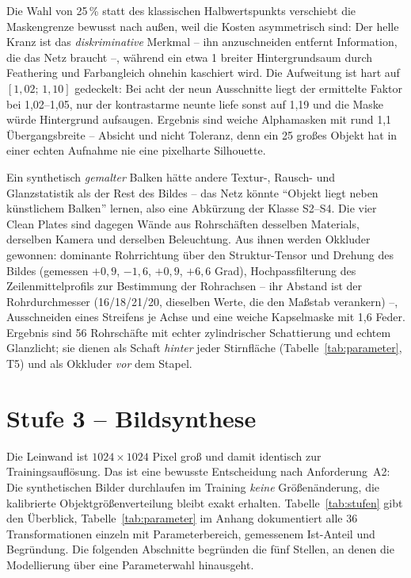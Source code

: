 Die Wahl von 25\,\% statt des klassischen Halbwertspunkts
\parencite{gonzalez2018} verschiebt die Maskengrenze bewusst nach außen, weil die
Kosten asymmetrisch sind: Der helle Kranz ist das \emph{diskriminative} Merkmal
-- ihn anzuschneiden entfernt Information, die das Netz braucht --, während ein
etwa 1\px{} breiter Hintergrundsaum durch Feathering und Farbangleich ohnehin
kaschiert wird. Die Aufweitung ist hart auf $[1{,}02;\,1{,}10]$ gedeckelt: Bei
acht der neun Ausschnitte liegt der ermittelte Faktor bei 1,02--1,05, nur der
kontrastarme neunte liefe sonst auf 1,19 und die Maske würde Hintergrund
aufsaugen. Ergebnis sind weiche Alphamasken mit rund 1,1\px{} Übergangsbreite --
Absicht und nicht Toleranz, denn ein 25\px{} großes Objekt hat in einer echten
Aufnahme nie eine pixelharte Silhouette.

 Ein synthetisch \emph{gemalter} Balken hätte andere
Textur-, Rausch- und Glanzstatistik als der Rest des Bildes -- das Netz könnte
\enquote{Objekt liegt neben künstlichem Balken} lernen, also eine Abkürzung der
Klasse S2--S4. Die vier Clean Plates sind dagegen Wände aus Rohrschäften
desselben Materials, derselben Kamera und derselben Beleuchtung. Aus ihnen werden
Okkluder gewonnen: dominante Rohrrichtung über den Struktur-Tensor
\parencite{jaehne2005} und Drehung des Bildes (gemessen $+0{,}9$, $-1{,}6$,
$+0{,}9$, $+6{,}6$ Grad), Hochpassfilterung des Zeilenmittelprofils zur
Bestimmung der Rohrachsen -- ihr Abstand ist der Rohrdurchmesser
(16/18/21/20\px, dieselben Werte, die den Maßstab verankern) --, Ausschneiden
eines Streifens je Achse und eine weiche Kapselmaske mit 1,6\px{} Feder.
Ergebnis sind 56 Rohrschäfte mit echter zylindrischer Schattierung und echtem
Glanzlicht; sie dienen als Schaft \emph{hinter} jeder Stirnfläche
(Tabelle~\ref{tab:parameter}, T5) und als Okkluder \emph{vor} dem Stapel.

\section{Stufe 3 -- Bildsynthese}
\label{sec:synthese}

Die Leinwand ist $1024\times1024$ Pixel groß und damit identisch zur
Trainingsauflösung. Das ist eine bewusste Entscheidung nach Anforderung~A2: Die
synthetischen Bilder durchlaufen im Training \emph{keine} Größenänderung, die
kalibrierte Objektgrößenverteilung bleibt exakt erhalten.
Tabelle~\ref{tab:stufen} gibt den Überblick, Tabelle~\ref{tab:parameter} im
Anhang dokumentiert alle 36 Transformationen einzeln mit Parameterbereich,
gemessenem Ist-Anteil und Begründung. Die folgenden Abschnitte begründen die fünf
Stellen, an denen die Modellierung über eine Parameterwahl hinausgeht.

